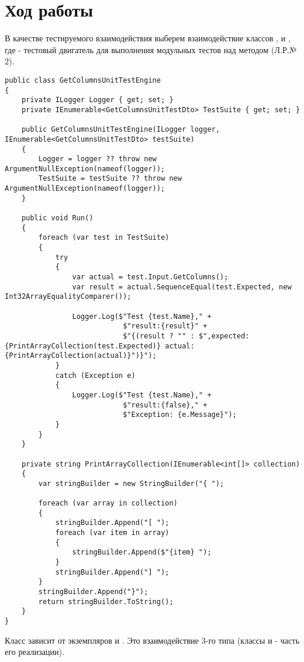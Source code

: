 \documentclass[a4paper,14pt]{extarticle}
\begin{document}
\section{Ход работы}
\sloppy
В качестве тестируемого взаимодействия выберем взаимодействие классов
,  и
, где  -
тестовый двигатель для выполнения модульных тестов над методом 
(Л.Р.№ 2).
\begin{lstlisting}
public class GetColumnsUnitTestEngine
{
    private ILogger Logger { get; set; }
    private IEnumerable<GetColumnsUnitTestDto> TestSuite { get; set; }

    public GetColumnsUnitTestEngine(ILogger logger, IEnumerable<GetColumnsUnitTestDto> testSuite)
    {
        Logger = logger ?? throw new ArgumentNullException(nameof(logger));
        TestSuite = testSuite ?? throw new ArgumentNullException(nameof(logger));
    }

    public void Run()
    {
        foreach (var test in TestSuite)
        {
            try
            {
                var actual = test.Input.GetColumns();
                var result = actual.SequenceEqual(test.Expected, new Int32ArrayEqualityComparer());

                Logger.Log($"Test {test.Name}," + 
                            $"result:{result}" + 
                            $"{(result ? "" : $",expected: {PrintArrayCollection(test.Expected)} actual:{PrintArrayCollection(actual)}")}");
            }
            catch (Exception e)
            {
                Logger.Log($"Test {test.Name}," +
                            $"result:{false}," +
                            $"Exception: {e.Message}");
            }
        }
    }

    private string PrintArrayCollection(IEnumerable<int[]> collection)
    {
        var stringBuilder = new StringBuilder("{ ");

        foreach (var array in collection)
        {
            stringBuilder.Append("[ ");
            foreach (var item in array)
            {
                stringBuilder.Append($"{item} ");
            }
            stringBuilder.Append("] ");
        }
        stringBuilder.Append("}");
        return stringBuilder.ToString();
    }
}
\end{lstlisting}

Класс  зависит от экземпляров  
и . Это взаимодействие 3-го типа (классы  и
 - часть его реализации).
\end{document}
